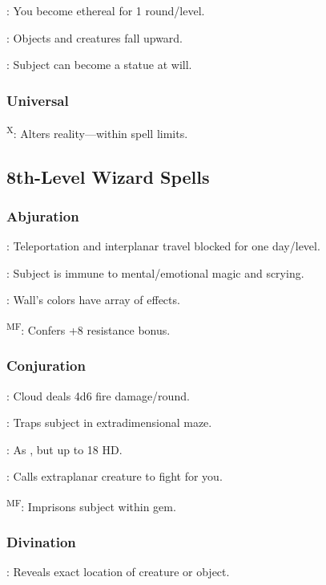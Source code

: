	: You become ethereal for 1 round/level.

	: Objects and creatures fall upward.

	: Subject can become a statue at will.

\subsubsection{Universal}
	\textsuperscript{X}: Alters reality---within spell limits.



\subsection{8th-Level Wizard Spells}

\subsubsection{Abjuration}
	: Teleportation and interplanar travel blocked for one day/level.

	: Subject is immune to mental/emotional magic and scrying.

	: Wall's colors have array of effects.

	\textsuperscript{MF}: Confers +8 resistance bonus.

\subsubsection{Conjuration}
	: Cloud deals 4d6 fire damage/round.

	: Traps subject in extradimensional maze.

	: As , but up to 18 HD.

	: Calls extraplanar creature to fight for you.

	\textsuperscript{MF}: Imprisons subject within gem.

\subsubsection{Divination}
	: Reveals exact location of creature or object.

